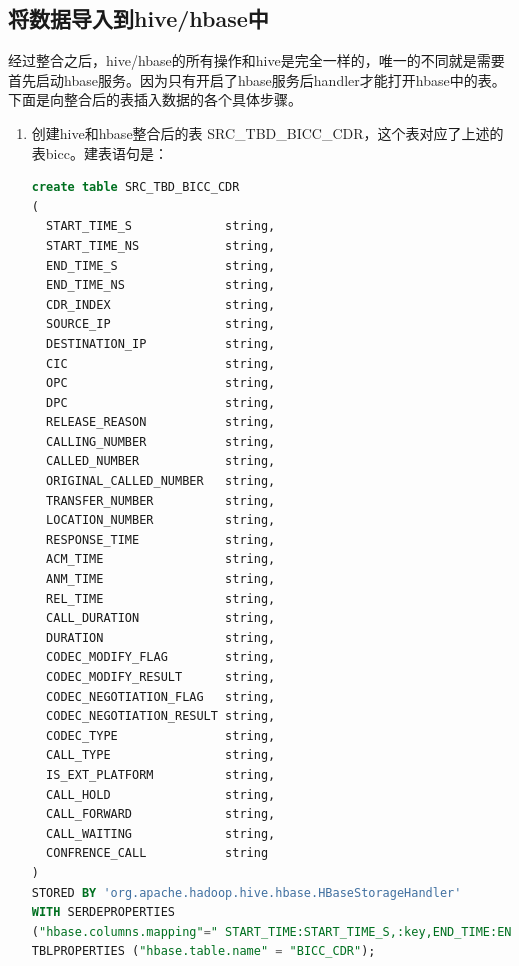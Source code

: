 \subsection{将数据导入到hive/hbase中}
经过整合之后，hive/hbase的所有操作和hive是完全一样的，唯一的不同就是需要首先启动hbase服务。因为只有开启了hbase服务后handler才能打开hbase中的表。下面是向整合后的表插入数据的各个具体步骤。
\begin{enumerate}

\item 创建hive和hbase整合后的表 SRC\_TBD\_BICC\_CDR，这个表对应了上述的表bicc。建表语句是：

\begin{lstlisting}[language=SQL]
create table SRC_TBD_BICC_CDR
(
  START_TIME_S             string,
  START_TIME_NS            string,
  END_TIME_S               string,
  END_TIME_NS              string,
  CDR_INDEX                string,
  SOURCE_IP                string,
  DESTINATION_IP           string,
  CIC                      string,
  OPC                      string,
  DPC                      string,
  RELEASE_REASON           string,
  CALLING_NUMBER           string,
  CALLED_NUMBER            string,
  ORIGINAL_CALLED_NUMBER   string,
  TRANSFER_NUMBER          string,
  LOCATION_NUMBER          string,
  RESPONSE_TIME            string,
  ACM_TIME                 string,
  ANM_TIME                 string,
  REL_TIME                 string,
  CALL_DURATION            string,
  DURATION                 string,
  CODEC_MODIFY_FLAG        string,
  CODEC_MODIFY_RESULT      string,
  CODEC_NEGOTIATION_FLAG   string,
  CODEC_NEGOTIATION_RESULT string,
  CODEC_TYPE               string,
  CALL_TYPE                string,
  IS_EXT_PLATFORM          string,
  CALL_HOLD                string,
  CALL_FORWARD             string,
  CALL_WAITING             string,
  CONFRENCE_CALL           string
)
STORED BY 'org.apache.hadoop.hive.hbase.HBaseStorageHandler'  
WITH SERDEPROPERTIES 
("hbase.columns.mapping"=" START_TIME:START_TIME_S,:key,END_TIME:END_TIME_S,END_TIME:END_TIME_NS,INDEX:CDR_INDEX,IP:SOURCE_IP,IP:DESTINATION_IP,C:CIC,C:OPC,C:DPC,REASON:RELEASE_REASON,NUMBER:CALLING_NUMBER,NUMBER:CALLED_NUMBER,NUMBER:ORIGINAL_CALLED_NUMBER,NUMBER:TRANSFER_NUMBER,NUMBER:LOCATION_NUMBER,TIME:RESPONSE_TIME,TIME:ACM_TIME,TIME:ANM_TIME,TIME:REL_TIME,DURATION:CALL_DURATION,DURATION:DURATION,CODEC:CODEC_MODIFY_FLAG,CODEC:CODEC_MODIFY_RESULT,CODEC:CODEC_NEGOTIATION_FLAG,CODEC:CODEC_NEGOTIATION_RESULT,TYPE:CODEC_TYPE,TYPE:CALL_TYPE,PLATFORM:IS_EXT_PLATFORM,CALL:CALL_HOLD,CALL:CALL_FORWARD,CALL:CALL_WAITING,CALL:CONFRENCE_CALL")
TBLPROPERTIES ("hbase.table.name" = "BICC_CDR");
\end{lstlisting}


\end{enumerate}
